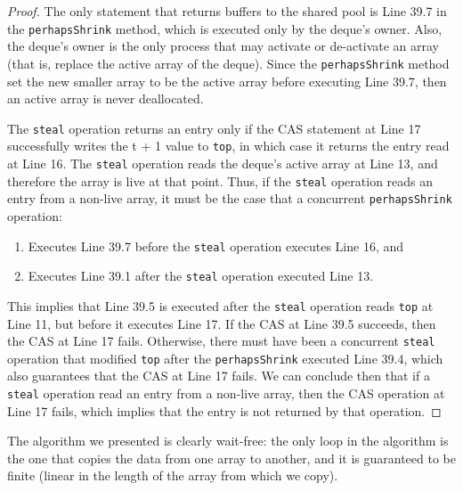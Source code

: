 \begin{proof}
  The only statement that returns buffers to the shared pool is Line
  39.7 in the \lstinline!perhapsShrink! method, which is executed only
  by the deque's owner. Also, the deque's owner is the only process
  that may activate or de-activate an array (that is, replace the
  active array of the deque). Since the \lstinline!perhapsShrink!
  method set the new smaller array to be the active array before
  executing Line 39.7, then an active array is never deallocated.

  The \lstinline!steal! operation returns an entry only if the CAS
  statement at Line 17 successfully writes the t + 1 value to
  \lstinline!top!, in which case it returns the entry read at Line
  16. The \lstinline!steal! operation reads the deque's active array
  at Line 13, and therefore the array is live at that point. Thus, if
  the \lstinline!steal! operation reads an entry from a non-live
  array, it must be the case that a concurrent
  \lstinline!perhapsShrink! operation:

  \begin{enumerate}
  \item Executes Line 39.7 before the \lstinline!steal! operation
    executes Line 16, and
  \item Executes Line 39.1 after the \lstinline!steal! operation
    executed Line 13.
  \end{enumerate}

  This implies that Line 39.5 is executed after the \lstinline!steal!
  operation reads \lstinline!top! at Line 11, but before it executes
  Line 17. If the CAS at Line 39.5 succeeds, then the CAS at Line 17
  fails. Otherwise, there must have been a concurrent
  \lstinline!steal! operation that modified \lstinline!top! after the
  \lstinline!perhapsShrink! executed Line 39.4, which also guarantees
  that the CAS at Line 17 fails. We can conclude then that if a
  \lstinline!steal! operation read an entry from a non-live array,
  then the CAS operation at Line 17 fails, which implies that the
  entry is not returned by that operation.
\end{proof}


The algorithm we presented is clearly wait-free: the only loop in the
algorithm is the one that copies the data from one array to another,
and it is guaranteed to be finite (linear in the length of the array
from which we copy).

